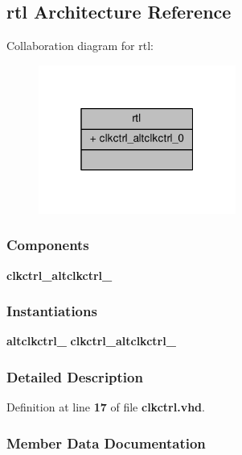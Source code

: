 \subsection{rtl Architecture Reference}
\label{classclkctrl_1_1rtl}


Collaboration diagram for rtl\+:\nopagebreak
\begin{figure}[H]
\begin{center}
\leavevmode
\includegraphics[width=184pt]{d3/dda/classclkctrl_1_1rtl__coll__graph}
\end{center}
\end{figure}
\subsubsection*{Components}
 \begin{DoxyCompactItemize}
\item 
{\bf clkctrl\+\_\+altclkctrl\+\_}  {\bfseries }  
\end{DoxyCompactItemize}
\subsubsection*{Instantiations}
 \begin{DoxyCompactItemize}
\item 
{\bf altclkctrl\+\_}  {\bfseries clkctrl\+\_\+altclkctrl\+\_}   
\end{DoxyCompactItemize}


\subsubsection{Detailed Description}


Definition at line {\bf 17} of file {\bf clkctrl.\+vhd}.



\subsubsection{Member Data Documentation}
